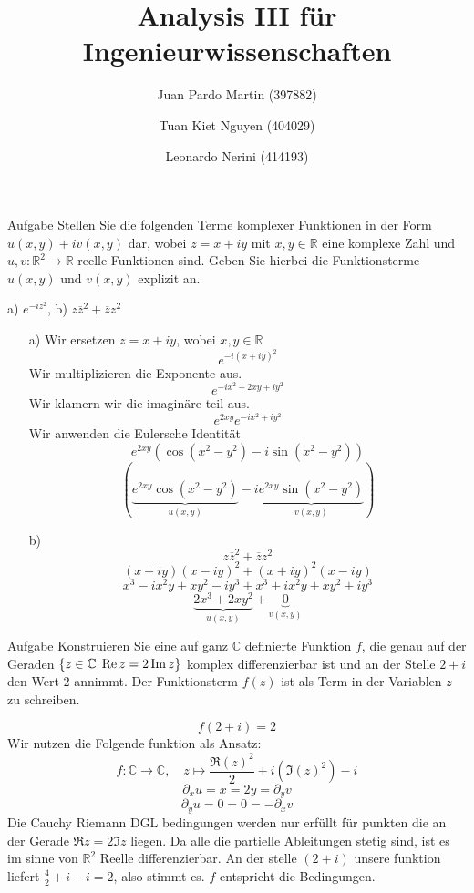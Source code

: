 \documentclass{scrartcl}
\title{Analysis III für Ingenieurwissenschaften}
\author{Juan Pardo Martin (397882)\and Tuan Kiet Nguyen (404029)\and Leonardo Nerini (414193)}
\def\mbb#1{\mathbb{#1}}
\def\bC{\mbb{C}}
\def\bR{\mbb{R}}
\newcommand{\func}[3]{#1\colon#2\to#3}
\newcommand{\vfunc}[5]{\func{#1}{#2}{#3},\quad#4\longmapsto#5}
\begin{document}
\maketitle

\begin{section}{Aufgabe}%
Stellen Sie die folgenden Terme komplexer Funktionen in der Form \(u(x, y)+iv(x, y)\) dar,
wobei \(z = x + iy\) mit \(x, y \in \mathbb R\) eine komplexe Zahl und \(u, v : \mathbb R^2 \rightarrow \mathbb R\) reelle Funktionen
sind. Geben Sie hierbei die Funktionsterme \(u(x, y)\) und \(v(x, y)\) explizit an.
\begin{center}
a) \(e^{-i z^2}\),    b) \(z\overline{z}^2+\overline{z}z^2\)
\end{center}
\begin{itemize}
\item[a)]
Wir ersetzen \(z=x+iy\), wobei \(x,y\in \mathbb R\)
\[e^{-i (x+i y)^2}\]
Wir multiplizieren die Exponente aus.
\[e^{-i x^2+2 x y+i y^2}\]
Wir klamern wir die imaginäre teil aus.
\[e^{2 x y} e^{-i x^2+i y^2}\]
Wir anwenden die Eulersche Identität
\[e^{2 x y} \left(\cos \left(x^2-y^2\right)-i \sin \left(x^2-y^2\right)\right)\]
\[\left(\underbrace{e^{2 x y} \cos \left(x^2-y^2\right)}_{u(x,y)}-i \underbrace{e^{2 x y}\sin \left(x^2-y^2\right)}_{v(x,y)}\right)\]
\newpage
\item[b)]
\[z\overline{z}^2+\overline{z}z^2\]
\[(x+i y) (x-i y)^2+(x+i y)^2 (x-i y)\]
\[x^3-i x^2 y+x y^2-i y^3+x^3+i x^2 y+x y^2+i y^3\]
\[\underbrace{2 x^3 + 2 x y^2}_{u(x,y)}+\underbrace{0}_{v(x,y)}\]
\end{itemize}
\end{section}
\begin{section}{Aufgabe}%
Konstruieren Sie eine auf ganz $\bC$ definierte Funktion $f$, die genau auf der Geraden \(\qty{z \in
\mathbb C | \Re z = 2 \Im z}\) komplex differenzierbar ist 
und an der Stelle \(2 + i\) den Wert 2 annimmt. Der Funktionsterm 
$f(z)$ ist als Term in der Variablen $z$ zu schreiben.

\[f(2+i)=2\]
Wir nutzen die Folgende funktion als Ansatz:
\[\vfunc{f}{\bC}{\bC}{z}{\frac{\Re(z)^2}{2}+i(\Im(z)^2)}-i\]
\[\partial_x u = x = 2y = \partial_y v\]
\[\partial_y u = 0 = 0 = - \partial_x v\]
Die Cauchy Riemann DGL bedingungen werden nur erfüllt für punkten die an der Gerade $ \Re z = 2 \Im z$ liegen.
Da alle die partielle Ableitungen stetig sind, ist es im sinne von $\bR^2$ Reelle differenzierbar.
An der stelle $(2+i)$ unsere funktion liefert $\frac{4}{2}+i-i=2$, also stimmt es.
$f$ entspricht die Bedingungen.


\end{section}
\end{document}
